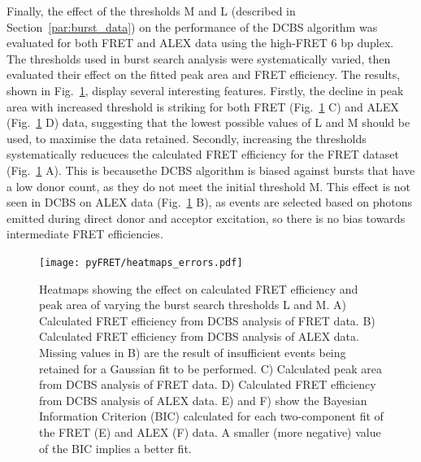 Finally, the effect of the thresholds M and L (described in Section~\ref{par:burst_data}) on the performance of the DCBS algorithm was evaluated for both FRET and ALEX data using the high-FRET 6 bp duplex.  The thresholds used in burst search analysis were systematically varied, then evaluated their effect on the fitted peak area and FRET efficiency. The results, shown in Fig.~\ref{fig:fig8_heatmaps}, display several interesting features. Firstly, the decline in peak area with increased threshold is striking for both FRET (Fig.~\ref{fig:fig8_heatmaps} C) and ALEX (Fig.~\ref{fig:fig8_heatmaps} D) data, suggesting that the lowest possible values of L and M should be used, to maximise the data retained. Secondly, increasing the thresholds systematically reducuces the calculated FRET efficiency for the FRET dataset (Fig.~\ref{fig:fig8_heatmaps} A). This is becausethe DCBS algorithm is biased against bursts that have a low donor count, as they do not meet the initial threshold M. This effect is not seen in DCBS on ALEX data (Fig.~\ref{fig:fig8_heatmaps} B), as events are selected based on photons emitted during direct donor and acceptor excitation, so there is no bias towards intermediate FRET efficiencies.

\begin{figure}[!ht]
   \begin{center}
      \texttt{[image: pyFRET/heatmaps\_errors.pdf]}
      \caption{Heatmaps showing the effect on calculated FRET efficiency and peak area of varying the burst search thresholds L and M. A) Calculated FRET efficiency from DCBS analysis of FRET data. B) Calculated FRET efficiency from DCBS analysis of ALEX data. Missing values in B) are the result of insufficient events being retained for a Gaussian fit to be performed. C) Calculated peak area from DCBS analysis of FRET data. D) Calculated FRET efficiency from DCBS analysis of ALEX data. E) and F) show the Bayesian Information Criterion (BIC) calculated for each two-component fit of the FRET (E) and ALEX (F) data. A smaller (more negative) value of the BIC implies a better fit.}
      \label{fig:fig8_heatmaps}
   \end{center}
\end{figure}

